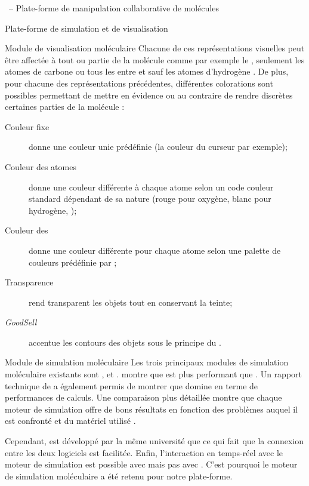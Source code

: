\documentclass[myfrancais,ngerman,english,frenchb]{mythesis}
\begin{document}
\begin{mychapter}{\myShaddock\ -- Plate-forme de manipulation collaborative de molécules}
\begin{mysection}{Plate-forme de simulation et de visualisation}
\begin{mysubsection}{Module de visualisation moléculaire}
				Chacune de ces représentations visuelles peut être affectée à tout ou partie de la molécule comme par exemple \og le   \fg, \og seulement les atomes de carbone \fg ou \og tous les  entre  et  sauf les atomes d'hydrogène \fg.
				De plus, pour chacune des représentations précédentes, différentes colorations sont possibles permettant de mettre en évidence ou au contraire de rendre discrètes certaines parties de la molécule :
				\begin{description}
					\item[Couleur fixe] donne une couleur unie prédéfinie (la couleur du curseur par exemple);
					\item[Couleur des atomes] donne une couleur différente à chaque atome selon un code couleur standard dépendant de sa nature (rouge pour oxygène, blanc pour hydrogène, \myetc);
					\item[Couleur des ] donne une couleur différente pour chaque atome selon une palette de couleurs prédéfinie par ;
					\item[Transparence] rend transparent les objets tout en conservant la teinte;
					\item[\textit{GoodSell}] accentue les contours des objets sous le principe du .
				\end{description}
			\end{mysubsection}
			\begin{mysubsection}{Module de simulation moléculaire}
				Les trois principaux modules de simulation moléculaire existants sont \myGromacs {},   et \myAMBER {}.
				 montre que \myGromacs est plus performant que .
				Un rapport technique de  a également permis de montrer que \myGromacs domine en terme de performances de calculs.
				Une comparaison plus détaillée montre que chaque moteur de simulation offre de bons résultats en fonction des problèmes auquel il est confronté et du matériel utilisé .

				Cependant,  est développé par la même université que  ce qui fait que la connexion entre les deux logiciels est facilitée.
				Enfin, l'interaction en temps-réel avec le moteur de simulation est possible avec  mais pas avec \myGromacs.
				C'est pourquoi le moteur de simulation moléculaire  a été retenu pour notre plate-forme.


\end{mysubsection}
\end{mysection}
\end{mychapter}
\end{document}
